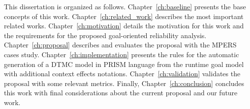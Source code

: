 This dissertation is organized as follows. Chapter~\ref{ch:baseline} presents the base concepts of this work. Chapter~\ref{ch:related_work} describes the most important related works. Chapter~\ref{ch:motivation} details the motivation for this work and the requirements for the proposed goal-oriented reliability analysis. Chapter~\ref{ch:proposal} describes and evaluates the  proposal with the MPERS cases study. Chapter~\ref{ch:implementation} presents the rules for the automatic generation of a DTMC model in PRISM language from the runtime goal model with additional context effects notations. Chapter~\ref{ch:validation} validates the proposal with some relevant metrics. Finally, Chapter~\ref{ch:conclusion} concludes this work with final considerations about the current proposal and our future work.